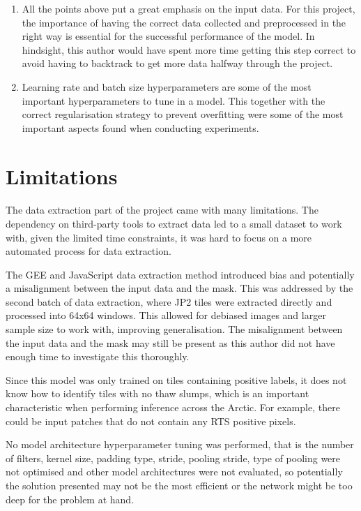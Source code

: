 \begin{enumerate}
    \item{All the points above put a great emphasis on the input data. For this project, the importance of having the correct data collected and preprocessed in the right way is essential for the successful performance of the model. In hindsight, this author would have spent more time getting this step correct to avoid having to backtrack to get more data halfway through the project.}
    \item{Learning rate and batch size hyperparameters are some of the most important hyperparameters to tune in a model. This together with the correct regularisation strategy to prevent overfitting were some of the most important aspects found when conducting experiments.}
\end{enumerate}

\section{Limitations}
\paragraph{}
The data extraction part of the project came with many limitations. The dependency on third-party tools to extract data led to a small dataset to work with, given the limited time constraints, it was hard to focus on a more automated process for data extraction.

The \gls{GEE} and JavaScript data extraction method introduced bias and potentially a misalignment between the input data and the mask.  This was addressed by the second batch of data extraction, where \gls{JP2} tiles were extracted directly and processed into 64x64 windows. This allowed for debiased images and larger sample size to work with, improving generalisation. The misalignment between the input data and the mask may still be present as this author did not have enough time to investigate this thoroughly.

Since this model was only trained on tiles containing positive labels, it does not know how to identify tiles with no thaw slumps, which is an important characteristic when performing inference across the Arctic. For example, there could be input patches that do not contain any \gls{RTS} positive pixels.

No model architecture hyperparameter tuning was performed, that is the number of filters, kernel size, padding type, stride, pooling stride, type of pooling were not optimised and other model architectures were not evaluated, so potentially the solution presented may not be the most efficient or the network might be too deep for the problem at hand.


